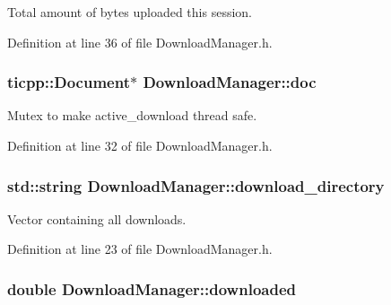 Total amount of bytes uploaded this session. 



Definition at line 36 of file DownloadManager.h.

\hypertarget{namespaceDownloadManager_afda6cacf879053184329453681a7e4d1}{
\subsubsection[{doc}]{\setlength{\rightskip}{0pt plus 5cm}ticpp::Document$\ast$ {\bf DownloadManager::doc}}}
\label{namespaceDownloadManager_afda6cacf879053184329453681a7e4d1}


Mutex to make active\_\-download thread safe. 



Definition at line 32 of file DownloadManager.h.

\hypertarget{namespaceDownloadManager_ade2c3e233a47be865abbe4a056de7f51}{
\subsubsection[{download\_\-directory}]{\setlength{\rightskip}{0pt plus 5cm}std::string {\bf DownloadManager::download\_\-directory}}}
\label{namespaceDownloadManager_ade2c3e233a47be865abbe4a056de7f51}


Vector containing all downloads. 



Definition at line 23 of file DownloadManager.h.

\hypertarget{namespaceDownloadManager_aebcd419189cce8e57f71d642b6b0538a}{
\subsubsection[{downloaded}]{\setlength{\rightskip}{0pt plus 5cm}double {\bf DownloadManager::downloaded}}}
\label{namespaceDownloadManager_aebcd419189cce8e57f71d642b6b0538a}


